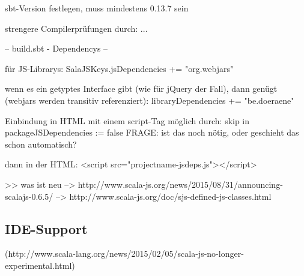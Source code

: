 \documentclass[a4paper, 12pt, hidelinks, listof=totoc, listoftables=totoc, bibliography=totoc]{scrreprt}
\begin{document}

sbt-Version festlegen, muss mindestens 0.13.7 sein


strengere Compilerprüfungen durch: ...


-- build.sbt - Dependencys --

für JS-Librarys:
SalaJSKeys.jsDependencies += "org.webjars" %

wenn es ein getyptes Interface gibt (wie für jQuery der Fall), dann genügt (webjars werden transitiv referenziert):
libraryDependencies += "be.doeraene" %

Einbindung in HTML mit einem script-Tag möglich durch:
skip in packageJSDependencies := false
FRAGE: ist das noch nötig, oder geschieht das schon automatisch?

dann in der HTML:
<script src="projectname-jsdeps.js"></script>











































>> was ist neu
  -->  http://www.scala-js.org/news/2015/08/31/announcing-scalajs-0.6.5/
  -->  http://www.scala-js.org/doc/sjs-defined-js-classes.html









\subsection{IDE-Support}
(http://www.scala-lang.org/news/2015/02/05/scala-js-no-longer-experimental.html)
\end{document}
